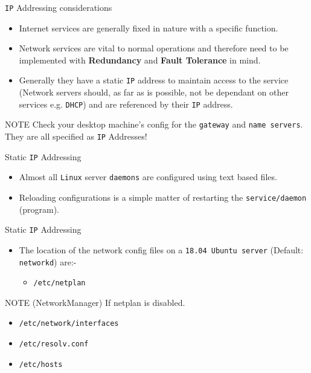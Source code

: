 \documentclass[aspectratio=169]{beamer}
\begin{document}
\begin{frame}{\texttt{IP} Addressing considerations}
   \begin{itemize}
     \item Internet services are generally fixed in nature with a specific function. 
     \item Network services are vital to normal operations and therefore need to be implemented with \textbf{Redundancy} and \textbf{Fault Tolerance} in mind.
     \item Generally they have a static \texttt{IP} address to maintain access to the service (Network servers should, as far as is possible, not be dependant on other services e.g. \texttt{DHCP}) and are referenced by their \texttt{IP} address.
   \end{itemize}
   \begin{block}{NOTE}
     Check your desktop machine's config for the \texttt{gateway} and \texttt{name servers}. They are  all specified as \texttt{IP} Addresses!
   \end{block}
\end{frame}

\begin{frame}{Static \texttt{IP} Addressing}
  \begin{itemize}
    \item Almost all \texttt{Linux} server \texttt{daemons} are configured using text based files.
    \item Reloading configurations is a simple matter of restarting the \texttt{service/daemon} (program).
  \end{itemize}
\end{frame}

\begin{frame}{Static \texttt{IP} Addressing}
  \begin{itemize}
    \item The location of the network config files on a \texttt{18.04 Ubuntu server} (Default: \texttt{networkd}) are:-
    \begin{itemize}
      \item \texttt{/etc/netplan}
    \end{itemize} 
  \end{itemize}
  \begin{block}{NOTE (NetworkManager)}
    If netplan is disabled.
    \begin{itemize}
      \item \texttt{/etc/network/interfaces}
      \item \texttt{/etc/resolv.conf}
      \item \texttt{/etc/hosts}
    \end{itemize} 
  \end{block}
\end{frame}
\end{document}
